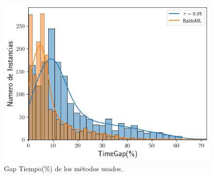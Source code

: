 \documentclass[spanish, a4paper, 12pt, openany,final]{book}
\begin{document}
\begin{figure}[H]
	\centering
	\includegraphics[scale=0.7]{graphs/full_timegap_comparison.png}
	\caption{Gap Tiempo(\%) de los métodos usados.}
	\label{fig:full_timegap}
\end{figure}
\end{document}
